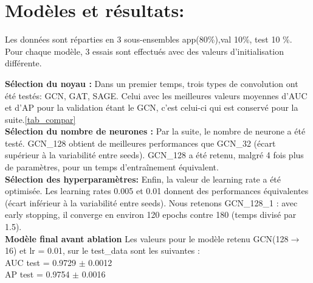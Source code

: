 \documentclass[french]{llncs}
\begin{document}
  
 
 \section{Modèles et résultats:   }

 Les données sont réparties en 3 sous-ensembles app(80\%),val 10\%, test 10 \%. Pour chaque modèle, 3 essais sont effectués avec des valeurs d'initialisation différente.

\textbf{Sélection du noyau  : }
Dans un premier temps, trois types de convolution ont été testés: GCN, GAT, SAGE. Celui avec les meilleures valeurs moyennes d'AUC et d'AP pour la validation étant le GCN, c'est celui-ci qui est conservé pour la suite.\ref{tab_compar}\\
\textbf{Sélection du nombre de neurones  : }
Par la suite, le nombre de neurone a été testé. GCN\_128 obtient de meilleures performances que GCN\_32 (écart supérieur à la variabilité entre seeds). GCN\_128 a été retenu, malgré 4 fois plus de paramètres, pour un temps d'entraînement équivalent.\\
\textbf{Sélection des hyperparamètres: }
Enfin, la valeur de learning rate a été optimisée. Les learning rates 0.005 et 0.01 donnent des performances équivalentes (écart inférieur à la variabilité entre seeds). Nous retenons GCN\_128\_1 : avec early stopping, il converge en environ 120 epochs contre 180 (temps divisé par 1.5).
\\
\textbf{Modèle final avant ablation }
Les valeurs pour le modèle retenu GCN(128$\rightarrow$ 16) et  lr = 0.01, sur le test\_data sont les suivantes : \\
AUC test =  0.9729 $\pm$ 0.0012\\
AP test =  0.9754 $\pm$ 0.0016
\end{document}
